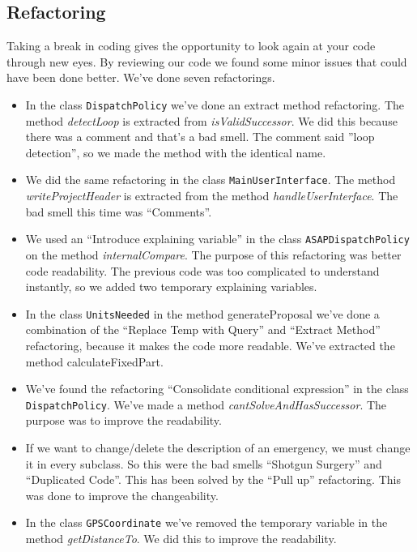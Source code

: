 \subsection{Refactoring}
Taking a break in coding gives the opportunity to look again at your code through new eyes. By reviewing our code we found some minor issues that could have been done better. We've done seven refactorings.
\begin{itemize}
	\item In the class \texttt{DispatchPolicy} we've done an extract method refactoring. The method \textit{detectLoop} is extracted from \textit{isValidSuccessor}. We did this because there was a comment and that's a bad smell. The comment said ''loop detection'', so we made the method with the identical name.
	\item We did the same refactoring in the class \texttt{MainUserInterface}. The method \textit{writeProjectHeader} is extracted from the method \textit{handleUserInterface}. The bad smell this time was ``Comments''.
	\item We used an ``Introduce explaining variable'' in the class \texttt{ASAPDispatchPolicy} on the method \textit{internalCompare}. The purpose of this refactoring was better code readability. The previous code was too complicated to understand instantly, so we added two temporary explaining variables.
	\item In the class \texttt{UnitsNeeded} in the method generateProposal we've done a combination of the ``Replace Temp with Query'' and ``Extract Method'' refactoring, because it makes the code more readable. We've extracted the method calculateFixedPart. 
	\item We've found the refactoring ``Consolidate conditional expression'' in the class \texttt{DispatchPolicy}. We've made a method \textit{cantSolveAndHasSuccessor}. The purpose was to improve the readability.
	\item If we want to change/delete the description of an emergency, we must change it in every subclass. So this were the bad smells ``Shotgun Surgery'' and ``Duplicated Code''. This has been solved by the ``Pull up'' refactoring. This was done to improve the changeability.
	\item In the class \texttt{GPSCoordinate} we've removed the temporary variable in the method \textit{getDistanceTo}. We did this to improve the readability.
\end{itemize}
